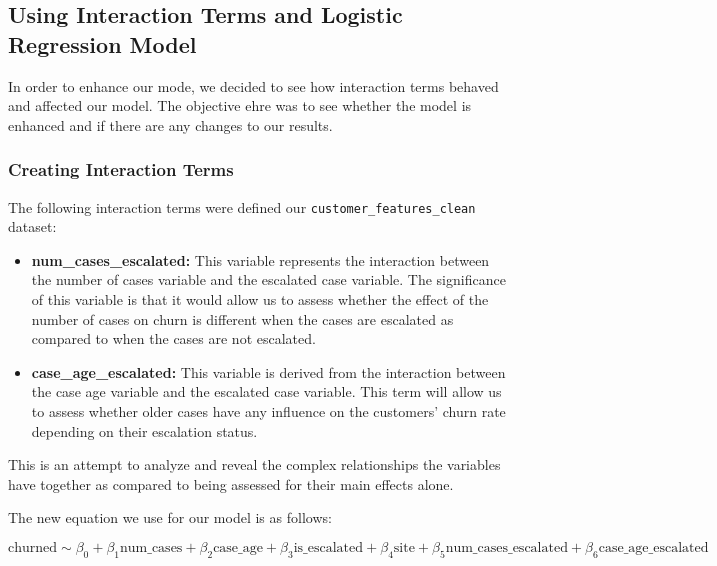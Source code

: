 \documentclass[
]{article}
\begin{document}
\subsection{Using Interaction Terms and Logistic Regression Model}\label{using-interaction-terms-and-logistic-regression-model}

In order to enhance our mode, we decided to see how interaction terms behaved and affected our model. The objective ehre was to see whether the model is enhanced and if there are any changes to our results.

\subsubsection{Creating Interaction Terms}\label{creating-interaction-terms}

The following interaction terms were defined our \texttt{customer\_features\_clean} dataset:

\begin{itemize}
\item
  \textbf{num\_cases\_escalated:} This variable represents the interaction between the number of cases variable and the escalated case variable. The significance of this variable is that it would allow us to assess whether the effect of the number of cases on churn is different when the cases are escalated as compared to when the cases are not escalated.
\item
  \textbf{case\_age\_escalated:} This variable is derived from the interaction between the case age variable and the escalated case variable. This term will allow us to assess whether older cases have any influence on the customers' churn rate depending on their escalation status.
\end{itemize}

This is an attempt to analyze and reveal the complex relationships the variables have together as compared to being assessed for their main effects alone.

The new equation we use for our model is as follows:

\[
\text{churned} \sim \beta_0 + \beta_1 \text{num_cases} + \beta_2 \text{case_age} + \beta_3 \text{is_escalated} + \beta_4 \text{site} + \beta_5 \text{num_cases_escalated} + \beta_6 \text{case_age_escalated}
\]
\end{document}
